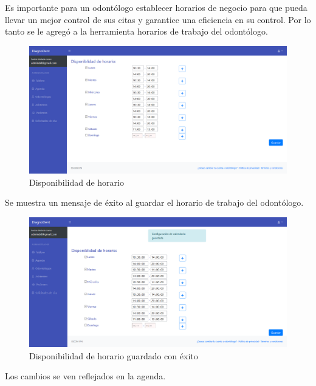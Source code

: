 Es importante para un odontólogo establecer horarios de negocio para que pueda llevar un mejor control de sus citas y garantice una eficiencia en su control. Por lo tanto se le agregó a la herramienta horarios de trabajo del odontólogo.

\begin{figure}[H]
\centering
\includegraphics[width=17cm,keepaspectratio]{pictures/adminodo/citas/disponibilidad-horario.png}
\caption{Disponibilidad de horario}
\end{figure}

Se muestra un mensaje de éxito al guardar el horario de trabajo del odontólogo.

\begin{figure}[H]
\centering
\includegraphics[width=17cm,keepaspectratio]{pictures/adminodo/citas/disponibilidad-horario-2.png}
\caption{Disponibilidad de horario guardado con éxito}
\end{figure}

Los cambios se ven reflejados en la agenda.

